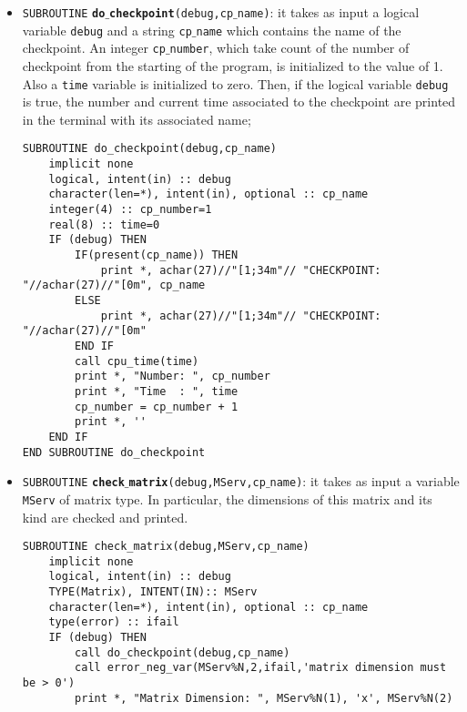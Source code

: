 \documentclass[rmp,10pt,onecolumn,fleqn,notitlepage]{revtex4-1}
\begin{document}
\begin{itemize}

    \item \texttt{SUBROUTINE} {\bfseries\texttt{do$\_$checkpoint}}\texttt{(debug,cp$\_$name)}: it takes as input a logical variable \texttt{debug} and a string \texttt{cp$\_$name} which contains the name of the checkpoint. An integer \texttt{cp$\_$number}, which take count of the number of checkpoint from the starting of the program, is initialized to the value of 1. Also a \texttt{time} variable is initialized to zero.
    Then, if the logical variable \texttt{debug} is true, the number and current time associated to the checkpoint are printed in the terminal with its associated name;

    \begin{minipage}[t]{0.85\linewidth}%
    \begin{lstlisting}[style=Fortran]
SUBROUTINE do_checkpoint(debug,cp_name)
	implicit none
	logical, intent(in) :: debug
    character(len=*), intent(in), optional :: cp_name
    integer(4) :: cp_number=1
    real(8) :: time=0
    IF (debug) THEN
        IF(present(cp_name)) THEN
            print *, achar(27)//"[1;34m"// "CHECKPOINT: "//achar(27)//"[0m", cp_name
        ELSE
            print *, achar(27)//"[1;34m"// "CHECKPOINT: "//achar(27)//"[0m"
        END IF
        call cpu_time(time)
        print *, "Number: ", cp_number
        print *, "Time  : ", time
        cp_number = cp_number + 1
        print *, ''
    END IF
END SUBROUTINE do_checkpoint\end{lstlisting}
    \end{minipage}

    \item \texttt{SUBROUTINE} {\bfseries\texttt{check$\_$matrix}}\texttt{(debug,MServ,cp$\_$name)}: it takes as input a variable \texttt{MServ} of matrix type. In particular, the dimensions of this matrix and its kind are checked and printed.

    \begin{minipage}[t]{0.76\linewidth}%
    \begin{lstlisting}[style=Fortran]
SUBROUTINE check_matrix(debug,MServ,cp_name)
    implicit none
    logical, intent(in) :: debug
    TYPE(Matrix), INTENT(IN):: MServ
    character(len=*), intent(in), optional :: cp_name
    type(error) :: ifail
    IF (debug) THEN
        call do_checkpoint(debug,cp_name)
        call error_neg_var(MServ%N,2,ifail,'matrix dimension must be > 0')
        print *, "Matrix Dimension: ", MServ%N(1), 'x', MServ%N(2)


\end{lstlisting}
\end{minipage}
\end{itemize}
\end{document}
